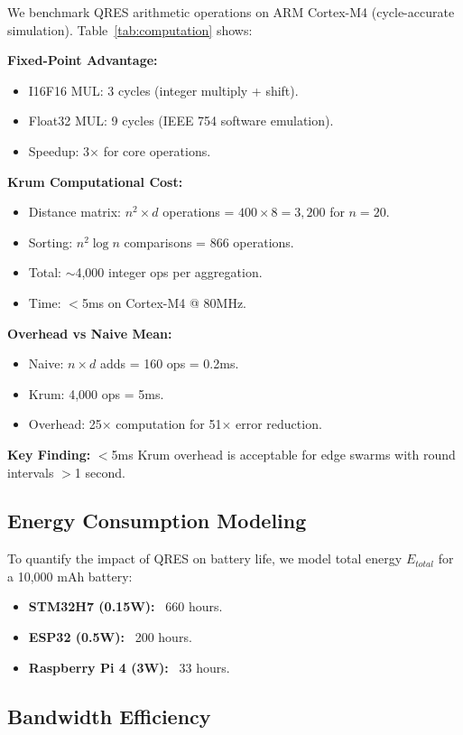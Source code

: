 \documentclass[conference,10pt]{IEEEtran}
\begin{document}
We benchmark QRES arithmetic operations on ARM Cortex-M4 (cycle-accurate simulation). Table~\ref{tab:computation} shows:

\textbf{Fixed-Point Advantage:}
\begin{itemize}
    \item I16F16 MUL: 3 cycles (integer multiply + shift).
    \item Float32 MUL: 9 cycles (IEEE 754 software emulation).
    \item Speedup: 3$\times$ for core operations.
\end{itemize}

\textbf{Krum Computational Cost:}
\begin{itemize}
    \item Distance matrix: $n^2 \times d$ operations = $400 \times 8 = 3{,}200$ for $n=20$.
    \item Sorting: $n^2 \log n$ comparisons = 866 operations.
    \item Total: $\sim$4,000 integer ops per aggregation.
    \item Time: $<$5ms on Cortex-M4 @ 80MHz.
\end{itemize}

\textbf{Overhead vs Naive Mean:}
\begin{itemize}
    \item Naive: $n \times d$ adds = 160 ops = 0.2ms.
    \item Krum: 4,000 ops = 5ms.
    \item Overhead: 25$\times$ computation for 51$\times$ error reduction.
\end{itemize}

\textbf{Key Finding:} $<$5ms Krum overhead is acceptable for edge swarms with round intervals $>$1 second.

\subsection{Energy Consumption Modeling}
To quantify the impact of QRES on battery life, we model total energy $E_{total}$ for a 10,000 mAh battery:
\begin{itemize}
    \item \textbf{STM32H7 (0.15W):} ~660 hours.
    \item \textbf{ESP32 (0.5W):} ~200 hours.
    \item \textbf{Raspberry Pi 4 (3W):} ~33 hours.
\end{itemize}

\subsection{Bandwidth Efficiency}
\end{document}
